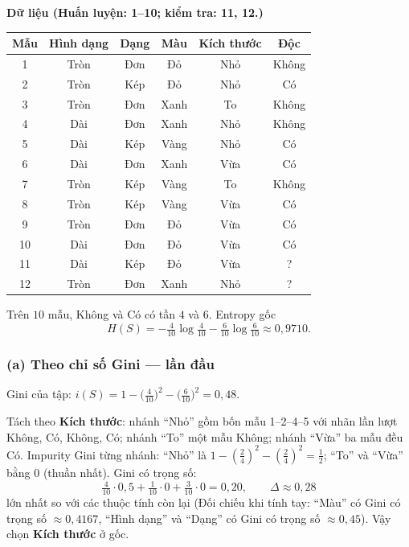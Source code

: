 \textbf{Dữ liệu (Huấn luyện: 1--10; kiểm tra: 11, 12.)}

\begin{center}
{\footnotesize
\begin{tabular}{@{}cccccc@{}}\toprule
Mẫu & Hình dạng & Dạng & Màu & Kích thước & Độc\\\midrule
1 & Tròn & Đơn & Đỏ & Nhỏ & Không\\
2 & Tròn & Kép & Đỏ & Nhỏ & Có\\
3 & Tròn & Đơn & Xanh & To & Không\\
4 & Dài & Đơn & Xanh & Nhỏ & Không\\
5 & Dài & Kép & Vàng & Nhỏ & Có\\
6 & Dài & Đơn & Xanh & Vừa & Có\\
7 & Tròn & Kép & Vàng & To & Không\\
8 & Tròn & Kép & Vàng & Vừa & Có\\
9 & Tròn & Đơn & Đỏ & Vừa & Có\\
10 & Dài & Đơn & Đỏ & Vừa & Có\\
11 & Dài & Kép & Đỏ & Vừa & ?\\
12 & Tròn & Đơn & Xanh & Nhỏ & ?\\
\bottomrule
\end{tabular}
}
\end{center}

Trên \(10\) mẫu, Không và Có có tần \(4\) và \(6\). Entropy gốc
\[
H(S)=-\tfrac{4}{10}\log\tfrac{4}{10}-\tfrac{6}{10}\log\tfrac{6}{10}\approx 0{,}9710.
\]

\subsubsection*{(a) Theo chỉ số Gini --- lần đầu}

Gini của tập: \(i(S)=1-\bigl(\tfrac{4}{10}\bigr)^2-\bigl(\tfrac{6}{10}\bigr)^2=0{,}48\).

Tách theo \textbf{Kích thước}: nhánh ``Nhỏ'' gồm bốn mẫu 1--2--4--5 với nhãn lần lượt Không, Có, Không, Có; nhánh ``To'' một mẫu Không; nhánh ``Vừa'' ba mẫu đều Có.
Impurity Gini từng nhánh: ``Nhỏ'' là \(1-(\tfrac{2}{4})^2-(\tfrac{2}{4})^2=\tfrac{1}{2}\); ``To'' và ``Vừa'' bằng \(0\) (thuần nhất). Gini có trọng số:
\[
\textstyle \tfrac{4}{10}\cdot 0{,}5+\tfrac{1}{10}\cdot 0+\tfrac{3}{10}\cdot 0=0{,}20,\qquad \Delta\approx 0{,}28
\]
lớn nhất so với các thuộc tính còn lại (Đối chiếu khi tính tay: ``Màu'' có Gini có trọng số \(\approx 0{,}4167\), ``Hình dạng'' và ``Dạng'' có Gini có trọng số \(\approx 0{,}45\)). Vậy chọn \textbf{Kích thước} ở gốc.

